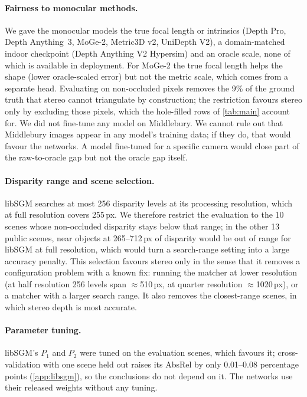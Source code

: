 \documentclass[10pt,twocolumn]{article}
\begin{document}
\paragraph{Fairness to monocular methods.} We gave the monocular models the true focal length or
intrinsics (Depth Pro, Depth Anything~3, MoGe-2, Metric3D v2, UniDepth V2), a domain-matched indoor checkpoint (Depth Anything V2 Hypersim) and an
oracle scale, none of which is available in deployment. For MoGe-2 the true focal length helps the
shape (lower oracle-scaled error) but not the metric scale, which comes from a separate head. Evaluating on non-occluded pixels removes the 9\% of the ground truth that
stereo cannot triangulate by construction; the restriction favours stereo only by excluding those
pixels, which the hole-filled rows of \cref{tab:main} account for. We did not fine-tune any model on Middlebury. We cannot rule out that Middlebury images appear in any model's training data; if they do,
that would favour the networks. A model fine-tuned for a specific camera would close part of the
raw-to-oracle gap but not the oracle gap itself.

\paragraph{Disparity range and scene selection.} libSGM searches at most 256 disparity levels at its
processing resolution, which at full resolution covers 255\,px. We therefore restrict the evaluation to
the 10 scenes whose non-occluded disparity stays below that range; in the other 13 public scenes, near
objects at 265--712\,px of disparity would be out of range for libSGM at full resolution, which would
turn a search-range setting into a large accuracy penalty. This selection favours stereo only in the
sense that it removes a configuration problem with a known fix: running the matcher at lower
resolution (at half resolution 256 levels span ${\approx}$510\,px, at quarter resolution
${\approx}$1020\,px), or a matcher with a larger search range. It also removes the closest-range
scenes, in which stereo depth is most accurate.

\paragraph{Parameter tuning.} libSGM's $P_1$ and $P_2$ were tuned on the evaluation scenes, which
favours it; cross-validation with one scene held out raises its AbsRel by only 0.01--0.08 percentage
points (\cref{app:libsgm}), so the conclusions do not depend on it. The networks use their released
weights without any tuning.
\end{document}
